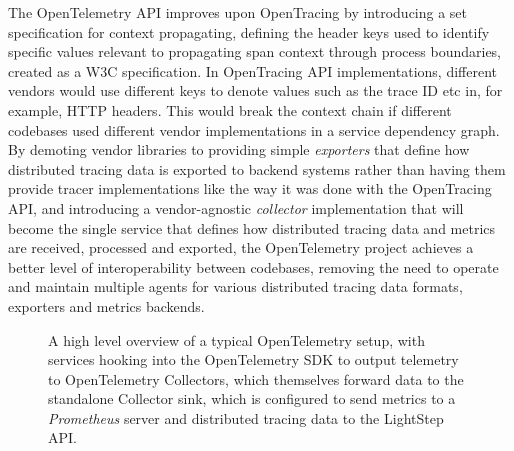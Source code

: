 \documentclass[12pt,pdftex,titlepage]{report}
\begin{document}
                The OpenTelemetry API improves upon OpenTracing by introducing a set specification for context propagating, defining the header keys used to identify specific values 
                relevant to propagating span context through process boundaries, created as a W3C specification\cite{tracecontext}. In OpenTracing API implementations, different vendors would use different 
                keys to denote values such as the trace ID etc in, for example, HTTP headers. This would break the context chain if different codebases used different vendor implementations
                in a service dependency graph. By demoting vendor libraries to providing simple \textit{exporters} that define how distributed tracing data is exported to backend systems
                rather than having them provide tracer implementations like the way it was done with the OpenTracing API, and introducing a vendor-agnostic \textit{collector} implementation that 
                will become the single service that defines how distributed tracing data and metrics are received, processed and exported, the OpenTelemetry project achieves a better level of 
                interoperability between codebases, removing the need to operate and maintain multiple agents for various distributed tracing data formats, exporters and metrics backends.

                \begin{figure}[hbt!]
                    \centering
                    \caption[High level overview of OpenTelemetry architecture]{A high level overview of a typical OpenTelemetry setup, with services hooking into the OpenTelemetry SDK to output telemetry to
                    OpenTelemetry Collectors, which themselves forward data to the standalone Collector sink, which is configured to send metrics to a \textit{Prometheus}
                    server and distributed tracing data to the LightStep API.}
                    \label{fig:otexporter}
                \end{figure}
\end{document}
